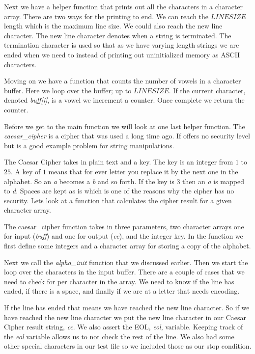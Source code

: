 Next we have a helper function that prints out all the characters in a character array. There are two ways for the printing to end. We can reach the $LINESIZE$ length which is the maximum line size. We could also reach the new line character. The new line character denotes when a string is terminated. The termination character is used so that as we have varying length strings we are ended when we need to instead of printing out uninitialized memory as \ac{ASCII} characters. 

Moving on we have a function that counts the number of vowels in a character buffer. Here we loop over the buffer; up to $LINESIZE$. If the current character, denoted \emph{buff[i]}, is a vowel we increment a counter. Once complete we return the counter. 

Before we get to the main function we will look at one last helper function. The \emph{caesar\_cipher} is a cipher that was used a long time ago. If offers no security level but is a good example problem for string manipulations. 

The Caesar Cipher takes in plain text and a key. The key is an integer from $1$ to $25$. A key of $1$ means that for ever letter you replace it by the next one in the alphabet. So an \emph{a} becomes a \emph{b} and so forth. If the key is $3$ then an \emph{a} is mapped to \emph{d}. Spaces are kept as is which is one of the reasons why the cipher has no security. Lets look at a function that calculates the cipher result for a given character array. 

The caesar\_cipher function takes in three parameters, two character arrays one for input (\emph{buff}) and one for output (\emph{cc}), and the integer key. In the function we first define some integers and a character array for storing a copy of the alphabet. 

Next we call the \emph{alpha\_init} function that we discussed earlier. Then we start the loop over the characters in the input buffer. There are a couple of cases that we need to check for per character in the array. We need to know if the line has ended, if there is a space, and finally if we are at a letter that needs encoding. 

If the line has ended that means we have reached the new line character. So if we have reached the new line character we put the new line character in our Caesar Cipher result string, \emph{cc}. We also assert the \ac{EOL}, \emph{eol}, variable. Keeping track of the \emph{eol} variable allows us to not check the rest of the line. We also had some other special characters in our test file so we included those as our stop condition. 


